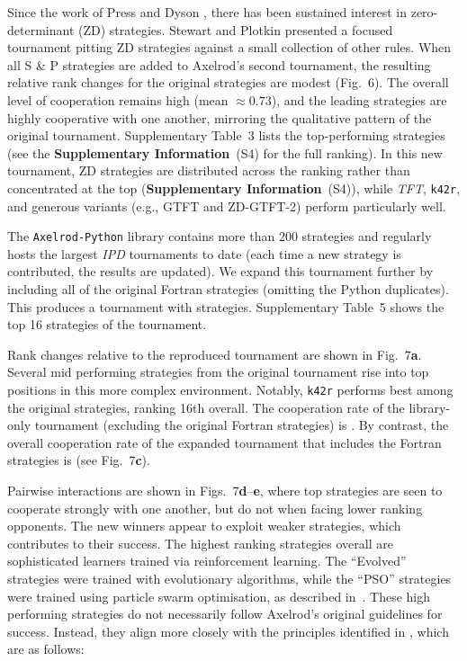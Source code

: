 \documentclass{article}
\newcommand{\TFT}{\emph{TFT}}
\newcommand{\IPD}{\emph{IPD}}
\newcommand{\AXL}{\texttt{Axelrod-Python}}
\newcommand{\SI}{\textbf{Supplementary Information}}
\begin{document}
Since the work of Press and Dyson \cite{Press2012}, there has been sustained
interest in zero-determinant (ZD) strategies. Stewart and Plotkin
\cite{Stewart2012} presented a focused tournament pitting ZD strategies against
a small collection of other rules. When all S \& P strategies are added to
Axelrod's second tournament, the resulting relative rank changes for the original
strategies are modest (Fig.~6). The overall
level of cooperation remains high (mean \(\approx 0.73\)), and the leading
strategies are highly cooperative with one another, mirroring the qualitative
pattern of the original tournament. Supplementary Table~3
lists the top-performing strategies (see the \SI~(S4) for the full ranking). In
this new tournament, ZD strategies are distributed across the ranking rather than
concentrated at the top (\SI~(S4)), while \TFT{}, \texttt{k42r}, and generous variants
(e.g., GTFT and ZD-GTFT-2) perform particularly well.

The \AXL{} library contains more than 200 strategies and regularly hosts
the largest \IPD{} tournaments to date (each time a new strategy is contributed,
the results are updated). We expand this tournament further by
including all of the original Fortran strategies (omitting the Python duplicates). 
This produces a tournament with
 strategies.
Supplementary Table~5 shows the top 16 strategies of the tournament.

Rank changes relative to the reproduced tournament are shown in
Fig.~7\textbf{a}.
Several mid performing strategies from the original tournament rise into top
positions in this more complex environment. Notably, \texttt{k42r} performs
best among the original strategies, ranking 16th overall. The cooperation rate
of the library-only tournament (excluding the original Fortran strategies) is
\unskip.
By contrast, the overall cooperation rate of the expanded tournament that includes
the Fortran strategies is 
(see Fig.~7\textbf{c}).

Pairwise interactions are shown in
Figs.~7\textbf{d}--\textbf{e},
where top strategies are seen to cooperate strongly with one another, but do not
when facing lower ranking opponents. The new winners appear to exploit weaker
strategies, which contributes to their success.
The highest ranking strategies overall are sophisticated learners trained via
reinforcement learning. The ``Evolved'' strategies were trained with evolutionary
algorithms, while the ``PSO'' strategies were trained using particle swarm
optimisation, as described in~\cite{Harper2017}. These high performing
strategies do not necessarily follow Axelrod's original guidelines for success.
Instead, they align more closely with the principles identified in
\cite{glynatsi2024properties}, which are as follows:
\end{document}
